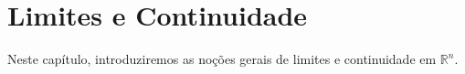 \chapter{Limites e Continuidade}
Neste capítulo, introduziremos as noções gerais de limites e continuidade em $\mathbb R^n$.



